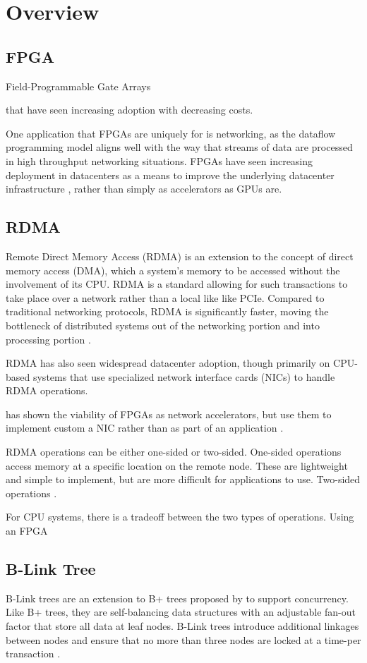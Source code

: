 \section{Overview}

\subsection{FPGA}

Field-Programmable Gate Arrays

that have seen increasing adoption with decreasing costs.

One application that FPGAs are uniquely for is networking, as the dataflow programming model aligns well with the way that streams of data are processed in high throughput networking situations. FPGAs have seen increasing deployment in datacenters as a means to improve the underlying datacenter infrastructure \cite{bobda-trets-2022}, rather than simply as accelerators as GPUs are.


\subsection{RDMA}

Remote Direct Memory Access (RDMA) is an extension to the concept of direct memory access (DMA), which a system's memory to be accessed without the involvement of its CPU. RDMA is a standard allowing for such transactions to take place over a network rather than a local like like PCIe. Compared to traditional networking protocols, RDMA is significantly faster, moving the bottleneck of distributed systems out of the networking portion and into processing portion \cite{binnig-vldb-2016}.

RDMA has also seen widespread datacenter adoption, though primarily on CPU-based systems that use specialized network interface cards (NICs) to handle RDMA operations.

\citet{star} has shown the viability of FPGAs as network accelerators, but \citeauthor{star} use them to implement custom a NIC rather than as part of an application \cite{star}.

RDMA operations can be either one-sided or two-sided. One-sided operations access memory at a specific location on the remote node. These are lightweight and simple to implement, but are more difficult for applications to use. Two-sided operations  \cite{base}.

For CPU systems, there is a tradeoff between the two types of operations. Using an FPGA


\subsection{B-Link Tree}

B-Link trees are an extension to B+ trees proposed by \citeauthor{b-link} to support concurrency. Like B+ trees, they are self-balancing data structures with an adjustable fan-out factor that store all data at leaf nodes. B-Link trees introduce additional linkages between nodes and ensure that no more than three nodes are locked at a time-per transaction \cite{b-link}.
